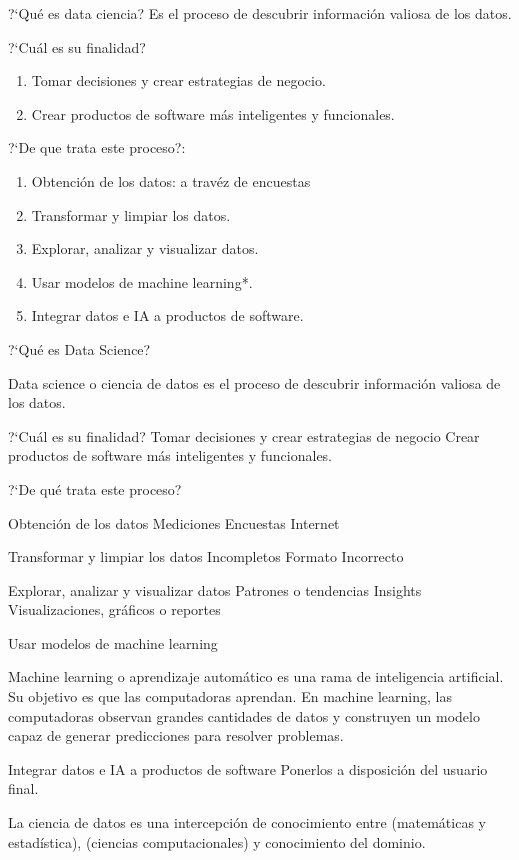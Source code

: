 ?`Qu\'e es data ciencia?
Es el proceso de descubrir informaci\'on valiosa de los datos.

?`Cu\'al es su finalidad?

\begin{enumerate}
	\item Tomar decisiones y crear estrategias de negocio.
	\item Crear productos de software m\'as inteligentes y funcionales.
\end{enumerate}

?`De que trata este proceso?:
\begin{enumerate}
	\item Obtenci\'on de los datos: a trav\'ez de encuestas
	\item Transformar y limpiar los datos.
	\item Explorar, analizar y visualizar datos.
	\item Usar modelos de machine learning*.
	\item Integrar datos e IA a productos de software.
\end{enumerate}




?`Qu\'e es Data Science?

Data science o ciencia de datos es el proceso de descubrir informaci\'on valiosa de los datos.

?`Cu\'al es su finalidad?
Tomar decisiones y crear estrategias de negocio
Crear productos de software m\'as inteligentes y funcionales.

?`De qu\'e trata este proceso?

Obtenci\'on de los datos
Mediciones
Encuestas
Internet

Transformar y limpiar los datos
Incompletos
Formato Incorrecto

Explorar, analizar y visualizar datos
Patrones o tendencias
Insights
Visualizaciones, gr\'aficos o reportes

Usar modelos de machine learning

Machine learning o aprendizaje autom\'atico es una rama de inteligencia artificial. Su objetivo es que las computadoras aprendan. En machine learning, las computadoras observan grandes cantidades de datos y construyen un modelo capaz de generar predicciones para resolver problemas.

Integrar datos e IA a productos de software
Ponerlos a disposici\'on del usuario final.


La ciencia de datos es una intercepci\'on de conocimiento entre (matem\'aticas y estad\'istica), (ciencias computacionales)  y conocimiento del dominio.

